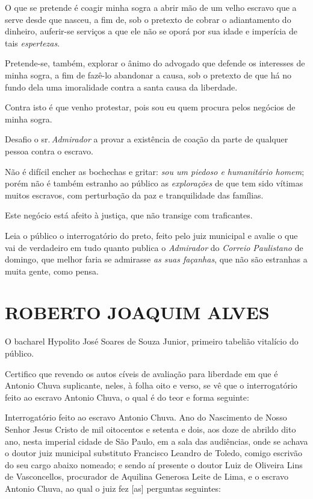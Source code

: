 O que se pretende é coagir minha sogra a abrir mão de um velho escravo
que a serve desde que nasceu, a fim de, sob o pretexto de cobrar o
adiantamento do dinheiro, auferir-se serviços a que ele não se oporá por
sua idade e imperícia de tais \emph{espertezas}.

Pretende-se, também, explorar o ânimo do advogado que defende os
interesses de minha sogra, a fim de fazê-lo abandonar a causa, sob o
pretexto de que há no fundo dela uma imoralidade contra a santa causa da
liberdade.

Contra isto é que venho protestar, pois sou eu quem procura pelos
negócios de minha sogra.

Desafio o sr.\,\emph{Admirador} a provar a existência de coação da parte
de qualquer pessoa contra o escravo.

Não é difícil encher as bochechas e gritar: \emph{sou um piedoso e
humanitário homem}; porém não é também estranho ao público as
\emph{explorações} de que tem sido vítimas muitos escravos, com
perturbação da paz e tranquilidade das famílias.

Este negócio está afeito à justiça, que não transige com traficantes.

Leia o público o interrogatório do preto, feito pelo juiz municipal e
avalie o que vai de verdadeiro em tudo quanto publica o \emph{Admirador}
do \emph{Correio Paulistano} de domingo, que melhor faria se admirasse
\emph{as suas façanhas}, que não são estranhas a muita gente, como
pensa.

\section{ROBERTO JOAQUIM ALVES}

\asterisc{}

O bacharel Hypolito José Soares de Souza Junior, primeiro tabelião
vitalício do público.

Certifico que revendo os autos cíveis de avaliação para liberdade em que
é Antonio Chuva suplicante, neles, à folha oito e verso, se vê que o
interrogatório feito ao escravo Antonio Chuva, o qual é do teor e forma
seguinte:

Interrogatório feito ao escravo Antonio Chuva. Ano do Nascimento de
Nosso Senhor Jesus Cristo de mil oitocentos e setenta e dois, aos doze
de abrildo dito ano, nesta imperial cidade de São Paulo, em a sala das
audiências, onde se achava o doutor juiz municipal substituto Francisco
Leandro de Toledo, comigo escrivão do seu cargo abaixo nomeado; e sendo
aí presente o doutor Luiz de Oliveira Lins de Vasconcellos, procurador
de Aquilina Generosa Leite de Lima, e o escravo Antonio Chuva, ao qual o
juiz fez {[}as{]} perguntas seguintes:

